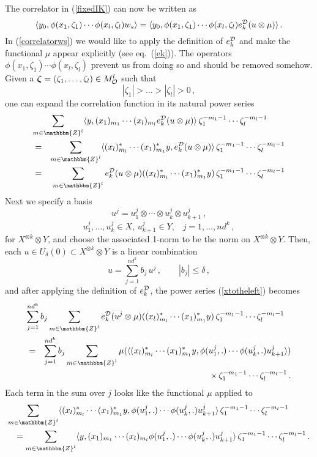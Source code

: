 \documentclass[a4paper,12pt,twoside]{article}
\renewcommand{\b}{\langle}
\renewcommand{\k}{\rangle}
\renewcommand{\v}[1]{\mbox{\boldmath $#1$}}
\renewcommand{\c}[1]{{\cal #1}}
\newcommand{\bZ}{\mathbbm{Z}}
\newcommand{\eq}[1]{(\ref{#1})}
\renewcommand{\O}{\c{O}}
\newcommand{\D}{\c{D}}
\newcommand{\Mo}{M^l_{\O}}
\newcommand{\ed}{e_k^{\D}}
\begin{document}
The correlator in \eq{fixedIK} can now be written as
\begin{equation}
\label{correlatorws}
\b y_0,\phi(x_1,\zeta_1)\cdots
\phi(x_l,\zeta_l)w_s\k
= \b y_0,\phi(x_1,\zeta_1)\cdots
\phi(x_l,\zeta_l)\ed(u\otimes\mu)\k\,.
\end{equation}
In \eq{correlatorws}
we would like to apply the definition of $\ed$
and make the functional $\mu$ appear explicitly (see eq.\ \eq{ek}).
The operators $\phi(x_1,\zeta_1)\cdots \phi(x_l,\zeta_l)$ prevent us from
doing so and should be removed somehow. Given a $\v{\zeta} =
(\zeta_1,\ldots,\zeta_l)\in\Mo$ such that
$$|\zeta_1|>\ldots>|\zeta_l|>0\,,$$
one can expand the correlation function in its natural power
series
\begin{eqnarray}
\lefteqn{\sum_{m\in\bZ^l}\b y,(x_1)_{m_1}\cdots
(x_l)_{m_l}\ed(u\otimes\mu)\k\,\zeta_1^{-m_1-1}\cdots\zeta_l^{-m_l-1}}
\nonumber
\\
& = &
\sum_{m\in\bZ^l}\b (x_l)^*_{m_l}\cdots
(x_1)^*_{m_1} y,\ed(u\otimes\mu)\k\,\zeta_1^{-m_1-1}\cdots\zeta_l^{-m_l-1} \nonumber
\\
& = & \label{xtotheleft}
\sum_{m\in\bZ^l}\ed(u\otimes\mu)((x_l)^*_{m_l}\cdots (x_1)^*_{m_1} y)\,\zeta_1^{-m_1-1}\cdots\zeta_l^{-m_l-1}
\end{eqnarray}
Next we specify a basis
$$u^j = u^j_1\otimes\cdots\otimes u^j_k\otimes u^j_{k+1}\,,$$
$$\mbox{$u^j_1,\ldots,u^j_k\in X$, $u^j_{k+1}\in Y$,}\quad j = 1,\ldots, nd^k\,,$$
for
$X^{\otimes k}\otimes Y$,
and choose the associated 1-norm to be the norm on $X^{\otimes k}\otimes Y$.
Then, each $u\in U_{\delta}(0)\subset X^{\otimes k}\otimes Y$ is a linear
combination
$$u = \sum_{j=1}^{nd^k} b_j\,u^j\,,\qquad |b_j|\le\delta\,,$$
and after applying the definition of $\ed$, the power series \eq{xtotheleft}
becomes
\begin{eqnarray}
\lefteqn{\sum_{j=1}^{nd^k} b_j\sum_{m\in\bZ^l}
\ed(u^j\otimes\mu)((x_l)^*_{m_l}\cdots (x_1)^*_{m_1} y)
\,\zeta_1^{-m_1-1}\cdots\zeta_l^{-m_l-1}}
\nonumber \\
& = &
\sum_{j=1}^{nd^k} b_j\sum_{m\in\bZ^l}\mu(\b (x_l)^*_{m_l}\cdots
(x_1)^*_{m_1} y,\phi(u^j_1,.)\cdots
\phi(u^j_k,.)u^j_{k+1}\k) \nonumber \\
& & \times\,\zeta_1^{-m_1-1}\cdots\zeta_l^{-m_l-1}\,.
\label{muLaurent}
\end{eqnarray}
Each term in the sum over $j$ looks like the functional $\mu$ applied
to
\begin{eqnarray}
\lefteqn{\sum_{m\in\bZ^l}\b (x_l)^*_{m_l}\cdots
(x_1)^*_{m_1} y,\phi(u^j_1,.)\cdots
\phi(u^j_k,.)u^j_{k+1}\k
\,\zeta_1^{-m_1-1}\cdots\zeta_l^{-m_l-1}} \nonumber \\
&& =
\sum_{m\in\bZ^l}\b y,(x_1)_{m_1}\cdots
(x_l)_{m_l}\phi(u^j_1,.)\cdots
\phi(u^j_k,.)u^j_{k+1}\k
\,\zeta_1^{-m_1-1}\cdots\zeta_l^{-m_l-1}\,.
\label{Hartogs}
\end{eqnarray}
\end{document}
